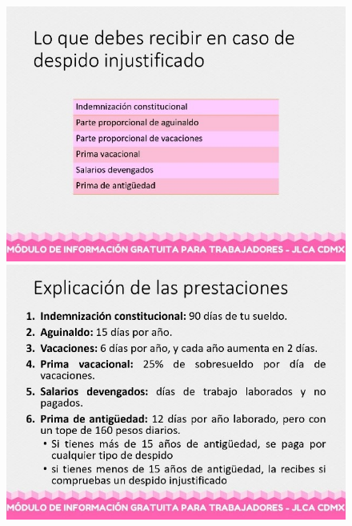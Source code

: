 \begin{figure}[H] 
  \centering
  \begin{minipage}[b]{0.45\textwidth}
    \includegraphics[width=\textwidth]{Figures/A2_5.jpg}
  \end{minipage}
  \begin{minipage}[b]{0.45\textwidth}
    \includegraphics[width=\textwidth]{Figures/A2_6.jpg}
  \end{minipage}
  \label{fig:A2_3_3}
\end{figure}
